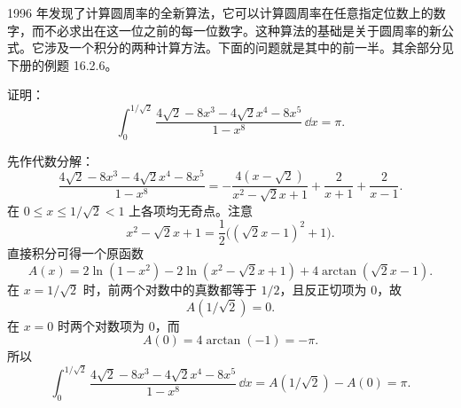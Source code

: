 \begin{xreferenceproblem}[8]
1996 年发现了计算圆周率的全新算法，它可以计算圆周率在任意指定位数上的数字，而不必求出在这一位之前的每一位数字。这种算法的基础是关于圆周率的新公式。它涉及一个积分的两种计算方法。下面的问题就是其中的前一半。其余部分见下册的例题 16.2.6。

证明：
\[
  \int_0^{1/\sqrt2}\frac{4\sqrt2-8x^3-4\sqrt2x^4-8x^5}{1-x^8}\,\dd x=\pi.
\]
\end{xreferenceproblem}
\begin{xsolution}
先作代数分解：
\[
  \frac{4\sqrt2-8x^3-4\sqrt2x^4-8x^5}{1-x^8}
  =-\frac{4(x-\sqrt2)}{x^2-\sqrt2x+1}
  +\frac2{x+1}+\frac2{x-1}.
\]
在 $0\leqslant x\leqslant1/\sqrt2<1$ 上各项均无奇点。注意
\[
  x^2-\sqrt2x+1
  =\frac12\bigl((\sqrt2x-1)^2+1\bigr).
\]
直接积分可得一个原函数
\[
  A(x)=2\ln(1-x^2)
  -2\ln(x^2-\sqrt2x+1)
  +4\arctan(\sqrt2x-1).
\]
在 $x=1/\sqrt2$ 时，前两个对数中的真数都等于 $1/2$，且反正切项为 $0$，故
\[
  A(1/\sqrt2)=0.
\]
在 $x=0$ 时两个对数项为 $0$，而
\[
  A(0)=4\arctan(-1)=-\pi.
\]
所以
\[
  \boxed{
  \int_0^{1/\sqrt2}
  \frac{4\sqrt2-8x^3-4\sqrt2x^4-8x^5}{1-x^8}\,\dd x
  =A(1/\sqrt2)-A(0)=\pi}.
\]
\end{xsolution}


